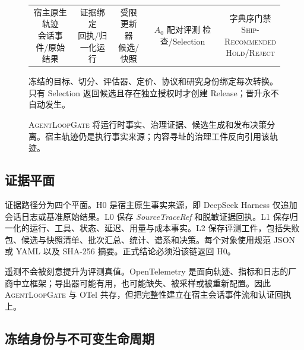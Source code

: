 \documentclass[UTF8,10pt,twocolumn,fontset=none]{ctexart}
\newcommand{\system}{\textsc{AgentLoopGate}\xspace}
\newcommand{\hold}{\textsc{Hold}\xspace}
\newcommand{\reject}{\textsc{Reject}\xspace}
\begin{document}
\begin{figure}[t]
\centering
\setlength{\tabcolsep}{3pt}
\renewcommand{\arraystretch}{1.35}
\small
\begin{tabular}{c@{\ $\rightarrow$\ }c@{\ $\rightarrow$\ }c@{\ $\rightarrow$\ }c@{\ $\rightarrow$\ }c}
\fbox{\parbox{0.155\textwidth}{\centering 宿主原生轨迹\\会话事件/原始结果}}
& \fbox{\parbox{0.155\textwidth}{\centering 证据绑定\\回执/归一化运行}}
& \fbox{\parbox{0.155\textwidth}{\centering 受限更新器\\候选/快照}}
& \fbox{\parbox{0.155\textwidth}{\centering $A_0$ 配对评测\\检查/Selection}}
& \fbox{\parbox{0.155\textwidth}{\centering 字典序门禁\\\textsc{Ship-}\\\textsc{Recommended}\\\hold/\reject}}
\end{tabular}
\vspace{3pt}

\small 冻结的目标、切分、评估器、定价、协议和研究身份绑定每次转换。只有 Selection 返回候选且存在独立授权时才创建 Release；晋升永不自动发生。
\caption{\system 将运行时事实、治理证据、候选生成和发布决策分离。宿主轨迹仍是执行事实来源；内容寻址的治理工件反向引用该轨迹。}
\label{fig:architecture-zh}
\end{figure}

\subsection{证据平面}

证据路径分为四个平面。H0 是宿主原生事实来源，即 DeepSeek Harness 仅追加会话日志或基准原始结果。L0 保存 \emph{SourceTraceRef} 和脱敏证据回执。L1 保存归一化的运行、工具、状态、延迟、用量与成本事实。L2 保存评测工件，包括失败包、候选与快照清单、批次汇总、统计、谱系和决策。每个对象使用规范 JSON 或 YAML 以及 SHA-256 摘要。正式结论必须沿该链返回 H0。

遥测不会被刻意提升为评测真值。OpenTelemetry 是面向轨迹、指标和日志的厂商中立框架\cite{opentelemetry2026}；导出器可能有用，也可能缺失、被采样或被重新配置。因此 \system 与 OTel 共存，但把完整性建立在宿主会话事件流和认证回执上。

\subsection{冻结身份与不可变生命周期}
\end{document}
